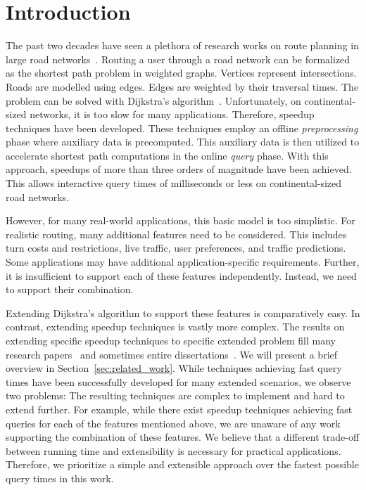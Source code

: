 \documentclass[manuscript,review]{acmart}
\begin{document}


\maketitle

\section{Introduction}
\label{sec:intro}
The past two decades have seen a plethora of research works on route planning in large road networks~\cite{bdgmpsww-rptn-16}.
Routing a user through a road network can be formalized as the shortest path problem in weighted graphs.
Vertices represent intersections.
Roads are modelled using edges.
Edges are weighted by their traversal times.
The problem can be solved with Dijkstra's algorithm~\cite{d-ntpcg-59}.
Unfortunately, on continental-sized networks, it is too slow for many applications.
Therefore, speedup techniques have been developed.
These techniques employ an offline \emph{preprocessing} phase where auxiliary data is precomputed.
This auxiliary data is then utilized to accelerate shortest path computations in the online \emph{query} phase.
With this approach, speedups of more than three orders of magnitude have been achieved.
This allows interactive query times of milliseconds or less on continental-sized road networks.

However, for many real-world applications, this basic model is too simplistic.
For realistic routing, many additional features need to be considered.
This includes turn costs and restrictions, live traffic, user preferences, and traffic predictions.
Some applications may have additional application-specific requirements.
Further, it is insufficient to support each of these features independently.
Instead, we need to support their combination.

Extending Dijkstra's algorithm to support these features is comparatively easy.
In contrast, extending speedup techniques is vastly more complex.
The results on extending specific speedup techniques to specific extended problem fill many research papers~\cite{gv-errnt-11,dgpw-crprn-13,dsw-cch-15,bwzz-cchtc-20,bgsv-mtdtt-13,swz-sfert-21} and sometimes entire dissertations~\cite{Delling2009_1000011046,b-tdrpc-14,Baum2018_1000082225}.
We will present a brief overview in Section~\ref{sec:related_work}.
While techniques achieving fast query times have been successfully developed for many extended scenarios, we observe two problems:
The resulting techniques are complex to implement and hard to extend further.
For example, while there exist speedup techniques achieving fast queries for each of the features mentioned above, we are unaware of any work supporting the combination of these features.
We believe that a different trade-off between running time and extensibility is necessary for practical applications.
Therefore, we prioritize a simple and extensible approach over the fastest possible query times in this work.
\end{document}
